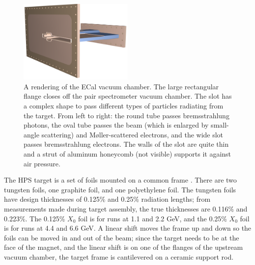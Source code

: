 \begin{figure}[htp]
    \begin{center}
        \includegraphics[width=0.5\textwidth]{detector/figs/ecal_vac}
    \end{center}
    \caption{A rendering of the ECal vacuum chamber.
    The large rectangular flange closes off the pair spectrometer vacuum chamber.
    The slot has a complex shape to pass different types of particles radiating from the target.
    From left to right: the round tube passes bremsstrahlung photons, the oval tube passes the beam (which is enlarged by small-angle scattering) and M{\o}ller-scattered electrons, and the wide slot passes bremsstrahlung electrons.
    The walls of the slot are quite thin and a strut of aluminum honeycomb (not visible) supports it against air pressure.
    }
    \label{fig:ecal_chamber}
\end{figure}

The HPS target is a set of foils mounted on a common frame \cite{field_hps_2015}.
There are two tungsten foils, one graphite foil, and one polyethylene foil.
The tungsten foils have design thicknesses of 0.125\% and 0.25\% radiation lengths; from measurements made during target assembly, the true thicknesses are 0.116\% and 0.223\%.
The 0.125\% $X_0$ foil is for runs at 1.1 and 2.2 GeV, and the 0.25\% $X_0$ foil is for runs at 4.4 and 6.6 GeV.
A linear shift moves the frame up and down so the foils can be moved in and out of the beam; since the target needs to be at the face of the magnet, and the linear shift is on one of the flanges of the upstream vacuum chamber, the target frame is cantilevered on a ceramic support rod.

